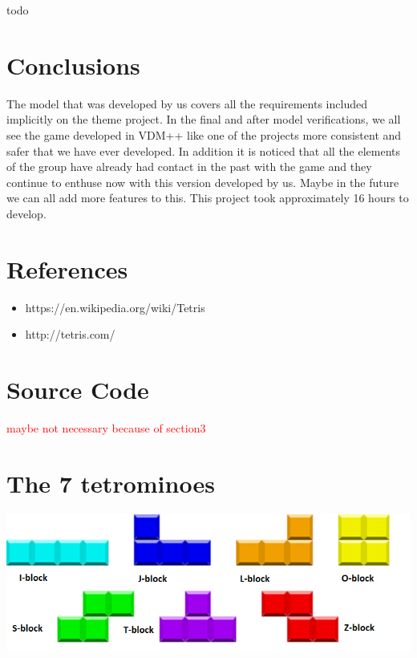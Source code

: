 \documentclass[a4paper]{article}
\begin{document}
todo

\section{Conclusions} 

The model that was developed by us covers all the requirements included implicitly on the theme project.
In the final and after model verifications, we all see the game developed in VDM++ like one of the projects more consistent and safer that we have ever developed. 
In addition it is noticed that all the elements of the group have already had contact in the past with the game and they continue to enthuse now with this version developed by us. Maybe in the future we can all add more features to this.
This project took approximately 16 hours to develop.


\section{References}

\begin{itemize}
\item https://en.wikipedia.org/wiki/Tetris
\item http://tetris.com/
\end{itemize}

\newpage
\appendix
\section{Source Code}
\textcolor{red}{maybe not necessary because of section3}
\section{The 7 tetrominoes}

\begin{center}
	\includegraphics[scale=0.7]{resources/img/tetrominoes}
	\label{tetrominoes}
\end{center}
\end{document}
